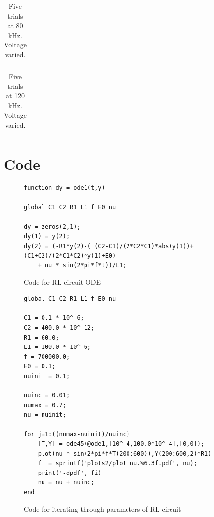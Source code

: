 \documentclass[12pt]{report}
\begin{document}
	\begin{table}[h] 
		\centering
		\begin{tabular}{|l|l|l|l|l|l|l|l|l|l|l|l|}
			\hline
			 
		\end{tabular}
		\caption{Five trials at 80 kHz. Voltage varied.}
		\label{tab:chaos2}
	\end{table}
	
	\begin{table}[h]
		\centering
		\begin{tabular}{|l|l|l|l|l|l|l|l|l|l|l|l|}
			\hline
			 
		\end{tabular}
		\caption{Five trials at 120 kHz. Voltage varied.}
		\label{tab:chaos2}
	\end{table}

\section{Code}
\label{sec: Code}

\begin{figure}[h]
\begin{lstlisting}
function dy = ode1(t,y)

global C1 C2 R1 L1 f E0 nu

dy = zeros(2,1);
dy(1) = y(2);
dy(2) = (-R1*y(2)-( (C2-C1)/(2*C2*C1)*abs(y(1))+ (C1+C2)/(2*C1*C2)*y(1)+E0)
	+ nu * sin(2*pi*f*t))/L1;
\end{lstlisting}
\caption{Code for RL circuit ODE}
\label{code:ode}
\end{figure}

\begin{figure}[h]
\begin{lstlisting}
global C1 C2 R1 L1 f E0 nu

C1 = 0.1 * 10^-6;
C2 = 400.0 * 10^-12;
R1 = 60.0;
L1 = 100.0 * 10^-6;
f = 700000.0;
E0 = 0.1;
nuinit = 0.1;

nuinc = 0.01;
numax = 0.7;
nu = nuinit;

for j=1:((numax-nuinit)/nuinc)
    [T,Y] = ode45(@ode1,[10^-4,100.0*10^-4],[0,0]);
    plot(nu * sin(2*pi*f*T(200:600)),Y(200:600,2)*R1)
    fi = sprintf('plots2/plot.nu.%6.3f.pdf', nu);
    print('-dpdf', fi)
    nu = nu + nuinc;
end
\end{lstlisting}
	\caption{Code for iterating through parameters of RL circuit}
	\label{code:run}
\end{figure}



\end{document}
